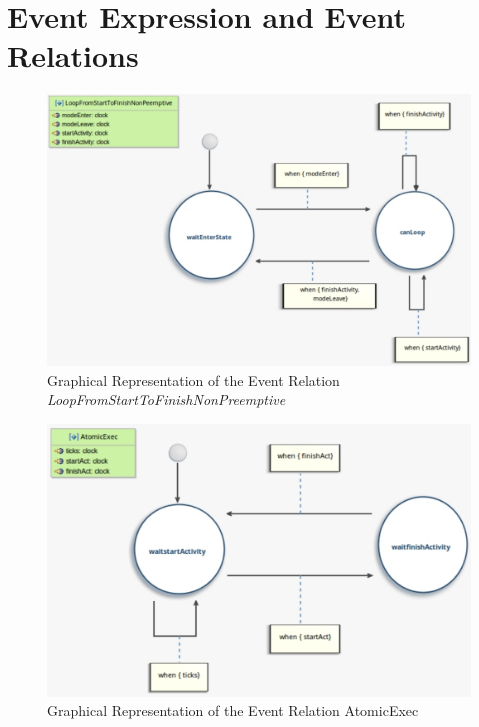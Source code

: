 \chapter{Event Expression and Event Relations}
\label{ap:expressionandrelations}






		
		\begin{figure}
			\center
			\includegraphics[scale=0.5]{examples/figs/LoopFromStartToFinishNonPreemptive}
			\caption{Graphical Representation of the Event Relation \emph{LoopFromStartToFinishNonPreemptive}}
			\label{fig:LoopFromStartToFinishNonPreemptive}
		\end{figure}



		\begin{figure}
			\center
			\includegraphics[scale=0.5]{examples/figs/AtomicExec}
			\caption{Graphical Representation of the Event Relation AtomicExec}
			\label{fig:AtomicExec}
		\end{figure}
		
